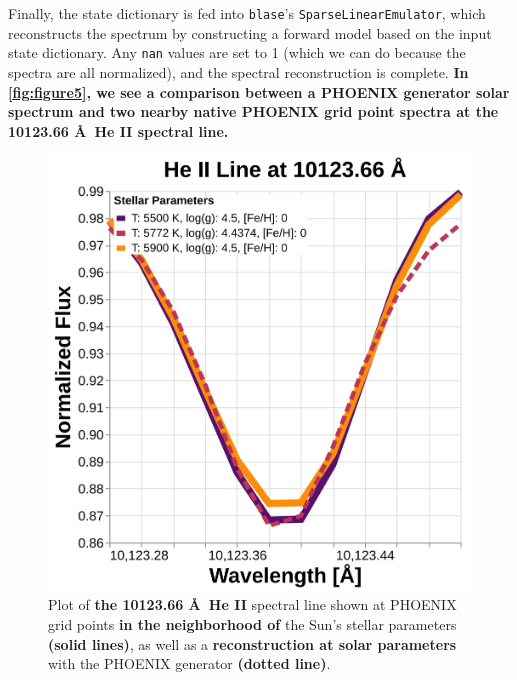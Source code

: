 \documentclass[twocolumn, linenumbers]{aastex631}
\begin{document}
Finally, the state dictionary is fed into \texttt{blase}'s \texttt{SparseLinearEmulator}, which reconstructs the spectrum by constructing a forward model based on the input state dictionary.
Any \texttt{nan} values are set to 1 (which we can do because the spectra are all normalized), and the spectral reconstruction is complete.
\textbf{In \autoref{fig:figure5}, we see a comparison between a PHOENIX generator solar spectrum and two nearby native PHOENIX grid point spectra at the 10123.66 \AA \ He II spectral line.}
\begin{figure}
    \centering
    \includegraphics[width=\columnwidth]{figure5}
    \caption{Plot of \textbf{the 10123.66 \AA \ He II} spectral line shown at PHOENIX grid points \textbf{in the neighborhood of} the Sun's stellar parameters \textbf{(solid lines)}, as well as a \textbf{reconstruction at solar parameters} with the PHOENIX generator \textbf{(dotted line)}.}
    \label{fig:figure5}
\end{figure}
\end{document}

